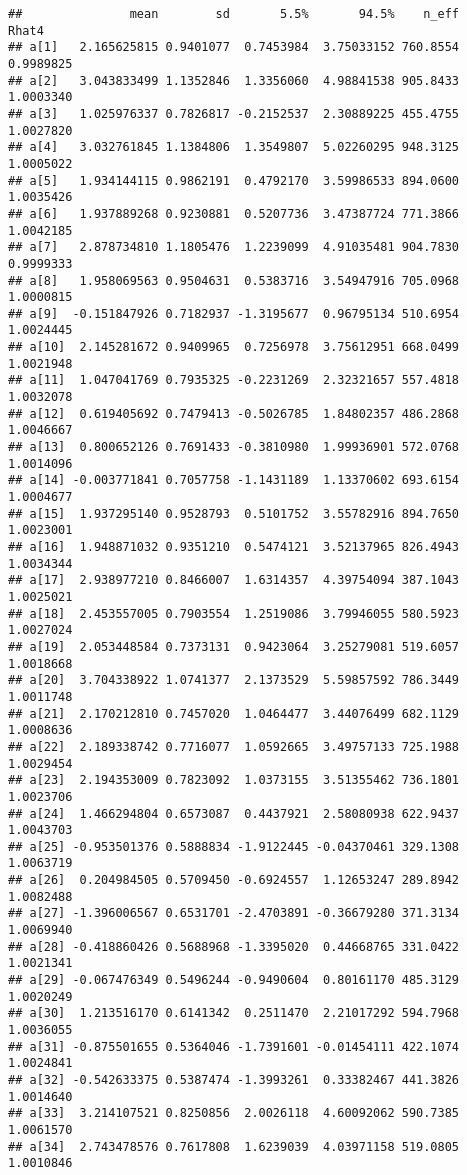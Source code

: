 \documentclass[
]{article}
\begin{document}
\begin{verbatim}
##               mean        sd       5.5%       94.5%    n_eff     Rhat4
## a[1]   2.165625815 0.9401077  0.7453984  3.75033152 760.8554 0.9989825
## a[2]   3.043833499 1.1352846  1.3356060  4.98841538 905.8433 1.0003340
## a[3]   1.025976337 0.7826817 -0.2152537  2.30889225 455.4755 1.0027820
## a[4]   3.032761845 1.1384806  1.3549807  5.02260295 948.3125 1.0005022
## a[5]   1.934144115 0.9862191  0.4792170  3.59986533 894.0600 1.0035426
## a[6]   1.937889268 0.9230881  0.5207736  3.47387724 771.3866 1.0042185
## a[7]   2.878734810 1.1805476  1.2239099  4.91035481 904.7830 0.9999333
## a[8]   1.958069563 0.9504631  0.5383716  3.54947916 705.0968 1.0000815
## a[9]  -0.151847926 0.7182937 -1.3195677  0.96795134 510.6954 1.0024445
## a[10]  2.145281672 0.9409965  0.7256978  3.75612951 668.0499 1.0021948
## a[11]  1.047041769 0.7935325 -0.2231269  2.32321657 557.4818 1.0032078
## a[12]  0.619405692 0.7479413 -0.5026785  1.84802357 486.2868 1.0046667
## a[13]  0.800652126 0.7691433 -0.3810980  1.99936901 572.0768 1.0014096
## a[14] -0.003771841 0.7057758 -1.1431189  1.13370602 693.6154 1.0004677
## a[15]  1.937295140 0.9528793  0.5101752  3.55782916 894.7650 1.0023001
## a[16]  1.948871032 0.9351210  0.5474121  3.52137965 826.4943 1.0034344
## a[17]  2.938977210 0.8466007  1.6314357  4.39754094 387.1043 1.0025021
## a[18]  2.453557005 0.7903554  1.2519086  3.79946055 580.5923 1.0027024
## a[19]  2.053448584 0.7373131  0.9423064  3.25279081 519.6057 1.0018668
## a[20]  3.704338922 1.0741377  2.1373529  5.59857592 786.3449 1.0011748
## a[21]  2.170212810 0.7457020  1.0464477  3.44076499 682.1129 1.0008636
## a[22]  2.189338742 0.7716077  1.0592665  3.49757133 725.1988 1.0029454
## a[23]  2.194353009 0.7823092  1.0373155  3.51355462 736.1801 1.0023706
## a[24]  1.466294804 0.6573087  0.4437921  2.58080938 622.9437 1.0043703
## a[25] -0.953501376 0.5888834 -1.9122445 -0.04370461 329.1308 1.0063719
## a[26]  0.204984505 0.5709450 -0.6924557  1.12653247 289.8942 1.0082488
## a[27] -1.396006567 0.6531701 -2.4703891 -0.36679280 371.3134 1.0069940
## a[28] -0.418860426 0.5688968 -1.3395020  0.44668765 331.0422 1.0021341
## a[29] -0.067476349 0.5496244 -0.9490604  0.80161170 485.3129 1.0020249
## a[30]  1.213516170 0.6141342  0.2511470  2.21017292 594.7968 1.0036055
## a[31] -0.875501655 0.5364046 -1.7391601 -0.01454111 422.1074 1.0024841
## a[32] -0.542633375 0.5387474 -1.3993261  0.33382467 441.3826 1.0014640
## a[33]  3.214107521 0.8250856  2.0026118  4.60092062 590.7385 1.0061570
## a[34]  2.743478576 0.7617808  1.6239039  4.03971158 519.0805 1.0010846

\end{verbatim}
\end{document}

